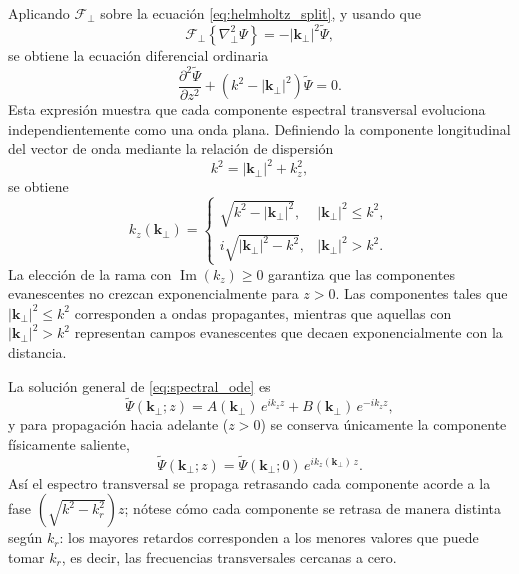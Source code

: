 \documentclass[12pt,a4paper]{article}
\numberwithin{equation}{section}
\begin{document}
Aplicando $\mathscr F_\perp$ sobre la ecuación \eqref{eq:helmholtz_split}, y usando que
\begin{equation}
\mathscr F_\perp
\left\{
\nabla_\perp^2\Psi
\right\}
=
-|\mathbf k_\perp|^2
\tilde{\Psi},
\label{eq:fourier_laplacian}
\end{equation}
se obtiene la ecuación diferencial ordinaria
\begin{equation}
\frac{\partial^2\tilde{\Psi}}{\partial z^2}
+
\left(
k^2
-
|\mathbf k_\perp|^2
\right)
\tilde{\Psi}
=
0.
\label{eq:spectral_ode}
\end{equation}
Esta expresión muestra que cada componente espectral transversal evoluciona independientemente como una onda plana. Definiendo la componente longitudinal del vector de onda mediante la relación de dispersión
\begin{equation}
k^2
=
|\mathbf k_\perp|^2
+
k_z^2,
\label{eq:dispersion_relation}
\end{equation}
se obtiene
\begin{equation}
k_z(\mathbf k_\perp)
=
\begin{cases}
\sqrt{
k^2-|\mathbf k_\perp|^2
},
&
|\mathbf k_\perp|^2\leq k^2,
\\[6pt]
i\sqrt{
|\mathbf k_\perp|^2-k^2
},
&
|\mathbf k_\perp|^2>k^2.
\end{cases}
\label{eq:kz_definition}
\end{equation}
La elección de la rama con $\operatorname{Im}(k_z)\geq0$ garantiza que las componentes evanescentes no crezcan exponencialmente para $z>0$. Las componentes tales que
$|\mathbf k_\perp|^2\leq k^2$
corresponden a ondas propagantes, mientras que aquellas con
$|\mathbf k_\perp|^2>k^2$
representan campos evanescentes que decaen exponencialmente con la distancia.

La solución general de \eqref{eq:spectral_ode} es
\begin{equation}
\tilde{\Psi}(\mathbf k_\perp;z)
=
A(\mathbf k_\perp)\,
e^{ik_z z}
+
B(\mathbf k_\perp)\,
e^{-ik_z z},
\label{eq:general_solution_spectral}
\end{equation}
y para propagación hacia adelante ($z>0$) se conserva únicamente la componente físicamente saliente,
\begin{equation}
\tilde{\Psi}(\mathbf k_\perp;z)
=
\tilde{\Psi}(\mathbf k_\perp;0)\,
e^{ik_z(\mathbf k_\perp)\,z}.
\label{eq:spectral_propagation}
\end{equation}
Así el espectro transversal se propaga retrasando cada componente acorde a la fase $\left( \sqrt{k^2 - k_r^2} \right ) z$; nótese cómo cada componente se retrasa de manera distinta según $k_r$: los mayores retardos corresponden a los menores valores que puede tomar $k_r$, es decir, las frecuencias transversales cercanas a cero.
\end{document}
